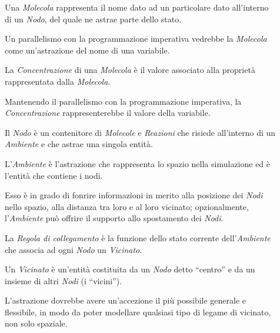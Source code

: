             \begin{description}

                \item[\label{itm:mol}]
                    Una \emph{Molecola} rappresenta il nome dato ad un particolare dato all'interno di un \emph{Nodo}, del quale ne astrae parte dello stato.

                    Un parallelismo con la programmazione imperativa vedrebbe la \emph{Molecola} come un'astrazione del nome di una variabile.

                \item[\label{itm:conc}]
                    La \emph{Concentrazione} di una \emph{Molecola} è il valore associato alla proprietà rappresentata dalla \emph{Molecola}.

                    Mantenendo il parallelismo con la programmazione imperativa, la \emph{Concentrazione} rappresenterebbe il valore della variabile.

                \item[\label{itm:node}]
                    Il \emph{Nodo} è un contenitore di \emph{Molecole} e \emph{Reazioni} che risiede all'interno di un \emph{Ambiente} e che astrae una singola entità.

                \item[\label{itm:env}]
                    L'\emph{Ambiente} è l'astrazione che rappresenta lo spazio nella simulazione ed è l'entità che contiene i nodi.

                    Esso è in grado di fonrire informazioni in merito alla posizione dei \emph{Nodi} nello spazio, alla distanza tra loro e al loro vicinato; opzionalmente, l'\emph{Ambiente} può offrire il supporto allo spostamento dei \emph{Nodi}.

                \item[\label{itm:linkr}]
                    La \emph{Regola di collegamento} è la funzione dello stato corrente dell'\emph{Ambiente} che associa ad ogni \emph{Nodo} un \emph{Vicinato}.

                \item[\label{itm:neigh}]
                    Un \emph{Vicinato} è un'entità costituita da un \emph{Nodo} detto ``centro'' e da un insieme di altri \emph{Nodi} (i ``vicini'').

                    L'astrazione dovrebbe avere un'accezione il più possibile generale e flessibile, in modo da poter modellare qualsiasi tipo di legame di vicinato, non solo spaziale.


\end{description}
